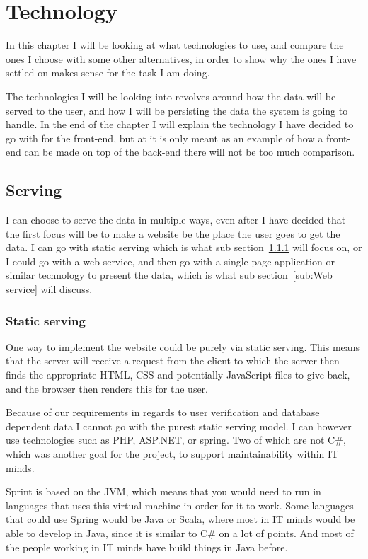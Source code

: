 \chapter{Technology}
\label{chap:Technology}
In this chapter I will be looking at what technologies to use, and compare the ones I choose with some other alternatives, in order to show why the ones I have settled on makes sense for the task I am doing.

The technologies I will be looking into revolves around how the data will be
served to the user, and how I will be persisting the data the system is going to
handle. In the end of the chapter I will explain the technology I have decided
to go with for the front-end, but at it is only meant as an example of how a
front-end can be made on top of the back-end there will not be too much
comparison. 

\section{Serving}
\label{sec:Serving}
I can choose to serve the data in multiple ways, even after I have decided that the first focus will be to make a website be the place the user goes to get the data. I can go with static serving which is what sub section~\ref{sub:Static serving} will focus on, or I could go with a web service, and then go with a single page application or similar technology to present the data, which is what sub section~\ref{sub:Web service} will discuss.

\subsection{Static serving}
\label{sub:Static serving}

One way to implement the website could be purely via static serving. This means that the server will receive a request from the client to which the server then finds the appropriate HTML, CSS and potentially JavaScript files to give back, and the browser then renders this for the user.

Because of our requirements in regards to user verification and database dependent data I cannot go with the purest static serving model. I can however use technologies such as PHP, ASP.NET, or spring. Two of which are not C\#, which was another goal for the project, to support maintainability within IT minds.

Sprint is based on the JVM\cite{spring-framework}, which means that you would need to run in languages that uses this virtual machine in order for it to work. Some languages that could use Spring would be Java or Scala, where most in IT minds would be able to develop in Java, since it is similar to C\# on a lot of points. And most of the people working in IT minds have build things in Java before.


